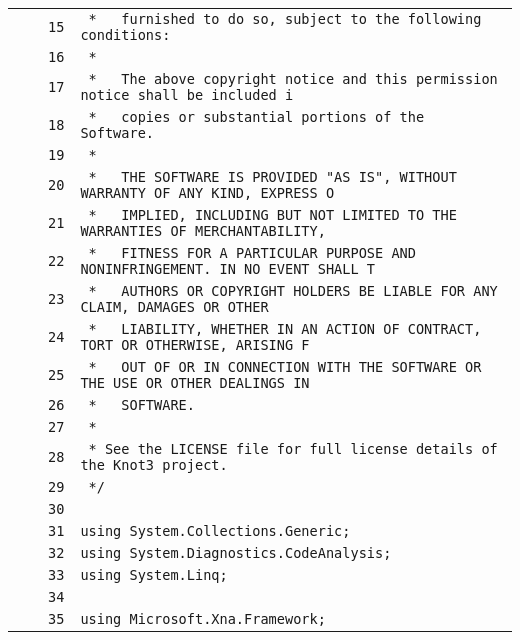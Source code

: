 \documentclass[a4paper,10pt]{article}
\begin{document}
\begin{longtable}[l]{lrrl}
\cellcolor{gray} &  & \verb~15~ & \verb~ *   furnished to do so, subject to the following conditions:~\\
\cellcolor{gray} &  & \verb~16~ & \verb~ *~\\
\cellcolor{gray} &  & \verb~17~ & \verb~ *   The above copyright notice and this permission notice shall be included i~\\
\cellcolor{gray} &  & \verb~18~ & \verb~ *   copies or substantial portions of the Software.~\\
\cellcolor{gray} &  & \verb~19~ & \verb~ *~\\
\cellcolor{gray} &  & \verb~20~ & \verb~ *   THE SOFTWARE IS PROVIDED "AS IS", WITHOUT WARRANTY OF ANY KIND, EXPRESS O~\\
\cellcolor{gray} &  & \verb~21~ & \verb~ *   IMPLIED, INCLUDING BUT NOT LIMITED TO THE WARRANTIES OF MERCHANTABILITY,~\\
\cellcolor{gray} &  & \verb~22~ & \verb~ *   FITNESS FOR A PARTICULAR PURPOSE AND NONINFRINGEMENT. IN NO EVENT SHALL T~\\
\cellcolor{gray} &  & \verb~23~ & \verb~ *   AUTHORS OR COPYRIGHT HOLDERS BE LIABLE FOR ANY CLAIM, DAMAGES OR OTHER~\\
\cellcolor{gray} &  & \verb~24~ & \verb~ *   LIABILITY, WHETHER IN AN ACTION OF CONTRACT, TORT OR OTHERWISE, ARISING F~\\
\cellcolor{gray} &  & \verb~25~ & \verb~ *   OUT OF OR IN CONNECTION WITH THE SOFTWARE OR THE USE OR OTHER DEALINGS IN~\\
\cellcolor{gray} &  & \verb~26~ & \verb~ *   SOFTWARE.~\\
\cellcolor{gray} &  & \verb~27~ & \verb~ *~\\
\cellcolor{gray} &  & \verb~28~ & \verb~ * See the LICENSE file for full license details of the Knot3 project.~\\
\cellcolor{gray} &  & \verb~29~ & \verb~ */~\\
\cellcolor{gray} &  & \verb~30~ & \verb~~\\
\cellcolor{gray} &  & \verb~31~ & \verb~using System.Collections.Generic;~\\
\cellcolor{gray} &  & \verb~32~ & \verb~using System.Diagnostics.CodeAnalysis;~\\
\cellcolor{gray} &  & \verb~33~ & \verb~using System.Linq;~\\
\cellcolor{gray} &  & \verb~34~ & \verb~~\\
\cellcolor{gray} &  & \verb~35~ & \verb~using Microsoft.Xna.Framework;~\\

\end{longtable}
\end{document}
